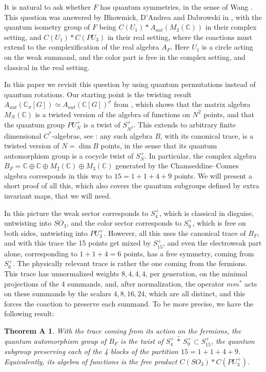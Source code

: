 \documentclass[11pt]{amsart}
\newtheorem*{theorema}{Theorem A}
\theoremstyle{definition}
\begin{document}
It is natural to ask whether $F$ has quantum symmetries, in the sense of Wang \cite{wan}. This question was answered by Bhowmick, D'Andrea and Dabrowski in \cite{bdd}, with the quantum isometry group of $F$ being $C(U_1)*A_{aut}(M_3(\mathbb C))$ in their complex setting, and $C(U_1)*C(PU_3)$ in their real setting, where the coactions must extend to the complexification of the real algebra $A_F$. Here $U_1$ is a circle acting on the weak summand, and the color part is free in the complex setting, and classical in the real setting.

In this paper we revisit this question by using quantum permutations instead of quantum rotations. Our starting point is the twisting result $A_{aut}(\mathbb C_\sigma[G])\simeq A_{aut}(\mathbb C[G])^\sigma$ from \cite{bbc}, which shows that the matrix algebra $M_N(\mathbb C)$ is a twisted version of the algebra of functions on $N^2$ points, and that the quantum group $PU_N^+$ is a twist of $S_{N^2}^+$. This extends to arbitrary finite dimensional $C^*$-algebras, see \cite{behy}: any such algebra $B$, with its canonical trace, is a twisted version of $N=\dim B$ points, in the sense that its quantum automorphism group is a cocycle twist of $S_N^+$. In particular, the complex algebra $B_F=\mathbb C\oplus\mathbb C\oplus M_2(\mathbb C)\oplus M_3(\mathbb C)$ generated by the Chamseddine--Connes algebra corresponds in this way to $15=1+1+4+9$ points. We will present a short proof of all this, which also covers the quantum subgroups defined by extra invariant maps, that we will need.

In this picture the weak sector corresponds to $S_4^+$, which is classical in disguise, untwisting into $SO_3$, and the color sector corresponds to $S_9^+$, which is free on both sides, untwisting into $PU_3^+$. However, all this uses the canonical trace of $B_F$, and with this trace the 15 points get mixed by $S_{15}^+$, and even the electroweak part alone, corresponding to $1+1+4=6$ points, has a free symmetry, coming from $S_6^+$. The physically relevant trace is rather the one coming from the fermions. This trace has unnormalized weights $8,4,4,4$, per generation, on the minimal projections of the 4 summands, and, after normalization, the operator $mm^*$ acts on these summands by the scalars $4,8,16,24$, which are all distinct, and this forces the coaction to preserve each summand. To be more precise, we have the following result:

\begin{theorema}
With the trace coming from its action on the fermions, the quantum automorphism group of $B_F$ is the twist of $S_4^+\,\hat{*}\,S_9^+\subset S_{15}^+$, the quantum subgroup preserving each of the 4 blocks of the partition $15=1+1+4+9$. Equivalently, its algebra of functions is the free product $C(SO_3)*C(PU_3^+)$.
\end{theorema}
\end{document}
